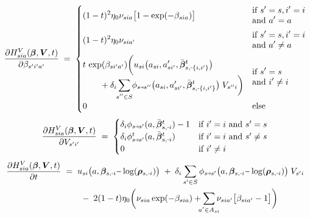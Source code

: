 \documentclass[11pt,fleqn]{article}
\newcommand{\bbeta}{\bm{\beta}}
\newcommand{\brho}{\bm{\rho}}
\newcommand{\bV}{\bm{V}}
\newcommand{\shortminus}{{\text{\scalebox{0.4}[1.0]{\(-\)}}}}
\newcommand{\minusi}{\shortminus i}
\newcommand{\mediumminus}{{\text{\scalebox{0.8}[1.0]{\(-\)}}}}
\newcommand{\shortrightarrow}{\parbox{4pt}{\tikz{\draw[->](0,0)--(4pt,0);}}}
\newcommand{\phiss}{\phi_{s\shortrightarrow s'}}
\begin{document}
\begin{align*}
	\frac{ \partial H^V_{sia}(\bbeta,\bV,t) }{ \partial \beta_{s'i'a'} } \;=\; 
		\begin{cases}
			\begin{aligned}
				& (1-t)^2\eta_0 \nu_{sia} \bigl[1-\exp(-\beta_{sia})\bigr]
			\end{aligned} & 
			\begin{aligned}
				& \text{if } s'=s, i'=i \\ &\text{and } a'=a
			\end{aligned} \\[1em]
			\begin{aligned}
				& (1-t)^2\eta_0 \nu_{sia'}
			\end{aligned} & 
			\begin{aligned}
				& \text{if } s'=s, i'=i \\ &\text{and } a'\neq a
			\end{aligned} \\[1em]
			\begin{aligned} 
				& t \, \exp(\beta_{si'a'}) \biggl( u_{si}\bigl(a_{si},a_{si'}',\bar{\bbeta}^t_{s,\shortminus\{i,i'\}}\bigr) \\
				& \qquad + \delta_i \sum\limits_{\mathclap{s''\in S}} \phi_{s\shortrightarrow s''}\bigl(a_{si},a_{si'}',\bar{\bbeta}^t_{s,\shortminus\{i,i'\}}\bigr) \; V_{s''i} \biggr)
			\end{aligned} & 
			\begin{aligned}
				& \text{if } s'=s \\ &\text{and } i'\neq i  
			\end{aligned} \\[1em]
			0 & \text{else}
		\end{cases}
\end{align*}
\begin{align*}
	\frac{ \partial H^V_{sia}(\bbeta,\bV,t) }{ \partial V_{s'i'} } \;=\;
		\begin{cases}
			\delta_i \phiss(a,\bar{\bbeta}^t_{s,\minusi}) - 1 &\text{if } i'=i \text{ and } s'=s \\
			\delta_i \phiss^t(a,\bar{\bbeta}^t_{s,\minusi}) &\text{if } i'=i \text{ and } s'\neq s \\
			0 &\text{if } i'\neq i
		\end{cases}
\end{align*}
\begin{align*}
	\frac{\partial H^V_{sia}(\bbeta,\bV,t) }{ \partial t } & \;=\; 
		u_{si}\bigl(a,\bbeta_{s,\minusi} \mediumminus \log(\brho_{s,\minusi})\bigr) \;+\; \delta_i \sum\limits_{s'\in S} \phiss\bigl(a,\bbeta_{s,\minusi} \mediumminus \log(\brho_{s,\minusi})\bigr) \; V_{s'i} \\
		& \qquad \;-\; 2(1-t)\eta_0 \biggl( \nu_{sia}\exp(-\beta_{sia}) + \sum\limits_{\mathclap{a'\in A_{si}}} \nu_{sia'} \bigl[ \beta_{sia'} - 1 \bigr] \biggr)
\end{align*}
\end{document}
